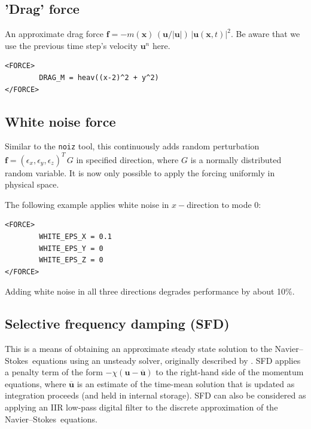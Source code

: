 \documentclass[11pt]{report}
\newcommand\NavSto{Navier--Stokes}
\begin{document}
\subsection{'Drag' force}

An approximate drag force
$\bm{f} = - m(\bm{x}) \, (\bm{u}/|\bm{u}|)\, |\bm{u}(\bm{x},
t)|^2$.
Be aware that we use the previous time step's velocity $\bm{u}^{n}$ here.
\begin{verbatim}
<FORCE>
        DRAG_M = heav((x-2)^2 + y^2)
</FORCE>
\end{verbatim}

\subsection{White noise force}

Similar to the \verb+noiz+ tool, this continuously adds random
perturbation $\bm{f} = (\epsilon_x, \epsilon_y, \epsilon_z)^T\,G$ in
specified direction, where $G$ is a normally distributed random
variable.  It is now only possible to apply the forcing uniformly in
physical space.

The following example applies white noise in $x-$direction to mode 0:
\begin{verbatim}
<FORCE>
        WHITE_EPS_X = 0.1
        WHITE_EPS_Y = 0
        WHITE_EPS_Z = 0
</FORCE>
\end{verbatim}
Adding white noise in all three directions degrades performance by
about 10\%. 

\subsection{Selective frequency damping (SFD)}
\label{sec.sfd}

This is a means of obtaining an approximate steady state solution to
the \NavSto\ equations using an unsteady solver, originally described
by \citet{abhhms06}. SFD applies a penalty term of the form
$-\chi(\bm{u}-\overline{\bm{u}})$ to the right-hand side of the
momentum equations, where $\overline{\bm{u}}$ is an estimate of the
time-mean solution that is updated as integration proceeds (and held
in internal storage). SFD can also be considered as applying an IIR
low-pass digital filter to the discrete approximation of the
\NavSto\ equations.
\end{document}
